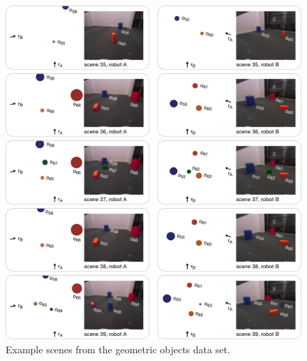 \begin{figure}[p]
  \parbox{\textwidth}{%
    \includegraphics[width=\textwidth]
    {figures/data-sets-geometric-objects-scene-1}\vspace{4.5mm}%
    
    \includegraphics[width=\textwidth]
    {figures/data-sets-geometric-objects-scene-2}\vspace{4.5mm}%
    
    \includegraphics[width=\textwidth]
    {figures/data-sets-geometric-objects-scene-3}\vspace{4.5mm}%
    
    \includegraphics[width=\textwidth]
    {figures/data-sets-geometric-objects-scene-4}\vspace{4.5mm}%
    
    \includegraphics[width=\textwidth]
    {figures/data-sets-geometric-objects-scene-5}\vspace{10mm}}
  \caption{Example scenes from the geometric objects data set.}
  \label{f:example-scenes-geometric-objects-set}
\end{figure}

